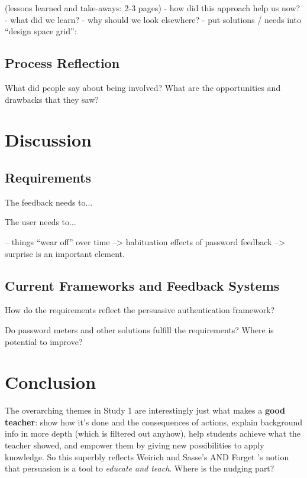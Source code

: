 (lessons learned and take-aways: 2-3 pages)
- how did this approach help us now?
- what did we learn?
- why should we look elsewhere?
- put solutions / needs into ``design space grid'':



\subsection{Process Reflection}
What did people say about being involved? What are the opportunities and drawbacks that they saw?
	
\section{Discussion}

\subsection{Requirements}
The feedback needs to...

The user needs to...



-- things ``wear off'' over time --> habituation effects of password feedback --> surprise is an important element. 

\subsection{Current Frameworks and Feedback Systems}
How do the requirements reflect the persuasive authentication framework?

Do password meters and other solutions fulfill the requirements?
Where is potential to improve?



\section{Conclusion}
The overarching themes in Study 1 are interestingly just what makes a \textbf{good teacher}: show how it's done and the consequences of actions, explain background info in more depth (which is filtered out anyhow), help students achieve what the teacher showed, and empower them by giving new possibilities to apply knowledge. So this superbly reflects Weirich and Sasse's AND Forget \etal's notion that persuasion is a tool to \textit{educate and teach}. Where is the nudging part?


